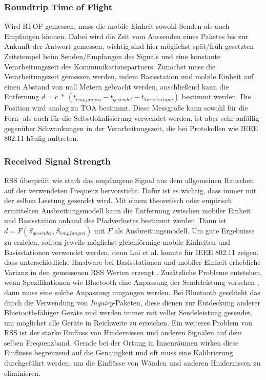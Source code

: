 \subsubsection{Roundtrip Time of Flight}
Wird RTOF gemessen, muss die mobile Einheit sowohl Senden als auch Empfangen können. 
Dabei wird die Zeit vom Aussenden eines Paketes bis zur Ankunft der Antwort gemessen, wichtig sind hier möglichst spät/früh gesetzten Zeitstempel beim Senden/Empfangen des Signals und eine konstante Verarbeitungszeit des Kommunikationspartners. 
Zunächst muss die Verarbeitungszeit gemessen werden, indem Basisstation und mobile Einheit auf einen Abstand von null Metern gebracht werden, anschließend kann die Entfernung $d = c\ *\ (t_{empfangen} - t_{gesendet} - t_{Verarbeitung})$ bestimmt werden. 
Die Position wird analog zu TOA bestimmt. Diese Messgröße kann sowohl für die Fern- als auch für die Selbstlokalisierung verwendet werden, ist aber sehr anfällig gegenüber Schwankungen in der Verarbeitungszeit, die bei Protokollen wie IEEE 802.11 häufig auftreten. 

\subsubsection{Received Signal Strength}
RSS überprüft wie stark das empfangene Signal aus dem allgemeinen Rauschen auf der verwendeten Frequenz hervorsticht. 
Dafür ist es wichtig, dass immer mit der selben Leistung gesendet wird. 
Mit einem theoretisch oder empirisch ermittelten Ausbreitungsmodell kann die Entfernung zwischen mobiler Einheit und Basisstation anhand des Pfadverlustes bestimmt werden. 
Dann ist $d = F(S_{gesendet},S_{empfangen})$ mit $F$ als Ausbreitungsmodell. 
Um gute Ergebnisse zu erzielen, sollten jeweils möglichst gleichförmige mobile Einheiten und Basisstationen verwendet werden, denn Lui et al. konnte für IEEE 802.11 zeigen, dass unterschiedliche Hardware bei Basisstationen und mobiler Einheit erhebliche Varianz in den gemessenen RSS Werten erzeugt \cite{lui2011differences}. 
Zusätzliche Probleme entstehen, wenn Spezifikationen wie Bluetooth eine Anpassung der Sendeleistung vorsehen \cite{hossain2007comprehensive}, dann muss eine solche Anpassung umgangen werden. 
Bei Bluetooth geschieht das durch die Verwendung von \emph{Inquiry}-Paketen, diese dienen zur Entdeckung anderer Bluetooth-fähiger Geräte und werden immer mit voller Sendeleistung gesendet, um möglichst alle Geräte in Reichweite zu erreichen.
Ein weiteres Problem von RSS ist der starke Einfluss von Hindernissen und anderen Signalen auf dem selben Frequenzband. 
Gerade bei der Ortung in Innenräumen wirken diese Einflüsse begrenzend auf die Genauigkeit und oft muss eine Kalibrierung durchgeführt werden, um die Einflüsse von Wänden und anderen Hindernissen zu eliminieren.



